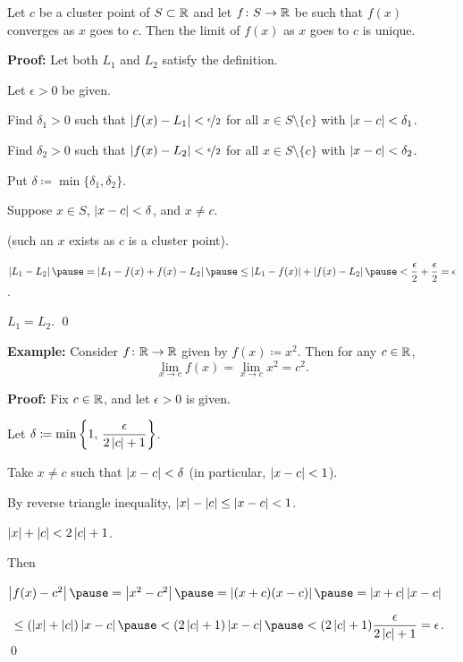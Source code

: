 \documentclass[10pt,aspectratio=169]{beamer}
\begin{document}
\begin{frame}

\begin{proposition}
Let $c$ be a cluster point of $S \subset {\mathbb{R}}$ and let $f \colon S \to {\mathbb{R}}$
be such that $f(x)$ converges as $x$ goes to $c$.
\pause
Then the limit of $f(x)$ as $x$ goes to $c$ is unique.
\end{proposition}

\pause
\textbf{Proof:}
Let both $L_1$ and $L_2$ satisfy the definition.

\pause
Let $\epsilon > 0$ be given.

\pause
Find $\delta_1 > 0$ such that $\left\lvert {f(x)-L_1} \right\rvert < \nicefrac{\epsilon}{2}$ 
for all $x \in S \setminus \{c\}$ with $\left\lvert {x-c} \right\rvert < \delta_1$.

\pause
Find $\delta_2 > 0$ such that $\left\lvert {f(x)-L_2} \right\rvert < \nicefrac{\epsilon}{2}$
for all $x \in S \setminus \{c\}$ with $\left\lvert {x-c} \right\rvert < \delta_2$.

\pause
Put $\delta \coloneqq \min \{ \delta_1, \delta_2 \}$.

\pause
Suppose $x \in S$, $\left\lvert {x-c} \right\rvert < \delta$, and $x \not= c$.

(such an $x$ exists as $c$ is a cluster point).

\pause
\medskip

$\displaystyle
\abs{L_1 - L_2}
\pause
=
\abs{L_1 - f(x) + f(x) - L_2}
\pause
\leq
\abs{L_1 - f(x)} + \abs{f(x) - L_2}
\pause
<
\frac{\epsilon}{2} + \frac{\epsilon}{2}
= \epsilon$.

\pause
\medskip

\thus \quad $L_1 = L_2$.
\qed
\end{frame}

\begin{frame}

\textbf{Example:}
Consider $f \colon {\mathbb{R}} \to {\mathbb{R}}$ given by $f(x) \coloneqq x^2$.  Then
for any $c \in {\mathbb{R}}$,
\begin{equation*}
\lim_{x\to c} f(x) = \lim_{x\to c} x^2 = c^2 .
\end{equation*}

\pause
\textbf{Proof:} Fix $c \in {\mathbb{R}}$, and let $\epsilon > 0$ is given.

\pause
Let $\delta \coloneqq \min \left\{ 1 , \, \dfrac{\epsilon}{2\left\lvert {c} \right\rvert+1} \right\}$.

\pause
Take $x \not= c$ such that $\left\lvert {x-c} \right\rvert < \delta$ (in particular, $\left\lvert {x-c} \right\rvert < 1$).

\pause
By reverse triangle inequality,
\quad
$\left\lvert {x} \right\rvert-\left\lvert {c} \right\rvert \leq \left\lvert {x-c} \right\rvert < 1$.

\pause
\thus \quad $\left\lvert {x} \right\rvert + \left\lvert {c} \right\rvert < 2\left\lvert {c} \right\rvert + 1$.

\pause
\medskip

Then

\medskip

$\abs{f(x) - c^2}
\pause
= \abs{x^2-c^2}
\pause
= \abs{(x+c)(x-c)}
\pause
= \abs{x+c}\abs{x-c}
$

\pause
\medskip

\qquad\qquad\,\!
$
\leq (\abs{x}+\abs{c})\abs{x-c}
\pause
< (2\abs{c}+1)\abs{x-c}
\pause
< (2\abs{c}+1)\dfrac{\epsilon}{2\abs{c}+1} = \epsilon$. \qed

\end{frame}
\end{document}
